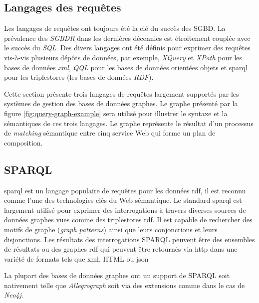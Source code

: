 \begin{itemize}
\section{Langages des requêtes}
\label{sec:query-languages}

Les langages de requêtes ont toujours été la clé du succès des
\acrshort{SGBD}. La prévalence des \emph{\acrshort{SGBDR}} dans les
dernières décennies est étroitement couplée avec le succès du
\emph{SQL}. Des divers langages ont été définis pour exprimer des
requêtes vis-à-vis plusieurs dépôts de données, par exemple,
\emph{XQuery} \cite{boag2002xquery} et \emph{XPath}
\cite{clark1999xml} pour les bases de données \emph{\acrshort{xml}},
\emph{QQL} \cite{alashqur1989oql} pour les bases de données orientées
objets et \acrshort{sparql} \cite{prud2008sparql} pour les
triplestores (les bases de données \emph{RDF}).



Cette section présente trois langages de requêtes largement supportés
par les systèmes de gestion des bases de données graphes. Le graphe
présenté par la figure \ref{fig:query-graph-example} sera utilisé pour
illustrer le syntaxe et la sémantiques de ces trois langages. Le
graphe représente le résultat d'un processus de \emph{matching}
sémantique entre cinq service Web qui forme un plan de composition.



  \subsection{SPARQL}
  \label{sec:sparql}

  \acrshort{sparql} \cite{prud2008sparql} est un langage populaire de
  requêtes pour les données \acrshort{rdf}, il est reconnu comme l'une
  des technologies clés du Web sémantique. Le standard
  \acrshort{sparql} est largement utilisé pour exprimer des
  interrogations à travers diverses sources de données graphes vues
  comme des triplestores \acrshort{rdf}. Il est capable de rechercher
  des motifs de graphe (\emph{graph patterns}) ainsi que leurs
  conjonctions et leurs disjonctions. Les résultats des interrogations
  \textsc{SPARQL} peuvent être des ensembles de résultats ou des
  graphes \acrshort{rdf} qui peuvent être retournés via
  \acrshort{http} dans une variété de formats tels que \acrshort{xml},
  HTML ou \acrshort{json}

  La plupart des bases de données graphes ont un support de
  \textsc{SPARQL} soit nativement telle que \emph{Allegrograph} soit
  via des extensions comme dans le cas de \emph{Neo4j}.


\end{itemize}
